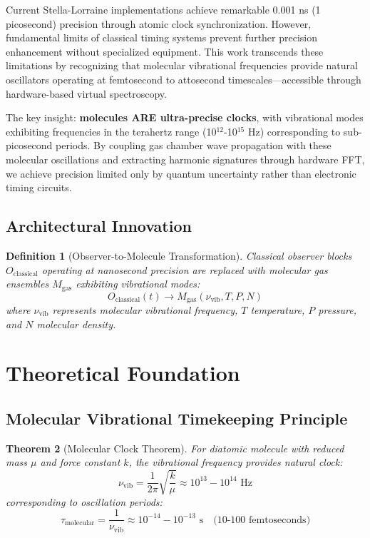 \documentclass[12pt,a4paper]{article}
\newtheorem{theorem}{Theorem}[section]
\newtheorem{definition}[theorem]{Definition}
\begin{document}
Current Stella-Lorraine implementations achieve remarkable 0.001 ns (1 picosecond) precision through atomic clock synchronization. However, fundamental limits of classical timing systems prevent further precision enhancement without specialized equipment. This work transcends these limitations by recognizing that molecular vibrational frequencies provide natural oscillators operating at femtosecond to attosecond timescales—accessible through hardware-based virtual spectroscopy.

The key insight: \textbf{molecules ARE ultra-precise clocks}, with vibrational modes exhibiting frequencies in the terahertz range (10$^{12}$-10$^{15}$ Hz) corresponding to sub-picosecond periods. By coupling gas chamber wave propagation with these molecular oscillations and extracting harmonic signatures through hardware FFT, we achieve precision limited only by quantum uncertainty rather than electronic timing circuits.

\subsection{Architectural Innovation}

\begin{definition}[Observer-to-Molecule Transformation]
Classical observer blocks $O_{\text{classical}}$ operating at nanosecond precision are replaced with molecular gas ensembles $M_{\text{gas}}$ exhibiting vibrational modes:
\begin{equation}
O_{\text{classical}}(t) \rightarrow M_{\text{gas}}(\nu_{\text{vib}}, T, P, N)
\end{equation}
where $\nu_{\text{vib}}$ represents molecular vibrational frequency, $T$ temperature, $P$ pressure, and $N$ molecular density.
\end{definition}

\section{Theoretical Foundation}

\subsection{Molecular Vibrational Timekeeping Principle}

\begin{theorem}[Molecular Clock Theorem]
For diatomic molecule with reduced mass $\mu$ and force constant $k$, the vibrational frequency provides natural clock:
\begin{equation}
\nu_{\text{vib}} = \frac{1}{2\pi}\sqrt{\frac{k}{\mu}} \approx 10^{13} - 10^{14} \text{ Hz}
\end{equation}
corresponding to oscillation periods:
\begin{equation}
\tau_{\text{molecular}} = \frac{1}{\nu_{\text{vib}}} \approx 10^{-14} - 10^{-13} \text{ s} \quad \text{(10-100 femtoseconds)}
\end{equation}
\end{theorem}
\end{document}
